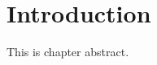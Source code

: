\chapter{Introduction}
\label{chapter:introduction}

\begin{ChapAbstract}
  This is chapter abstract.
\end{ChapAbstract}

